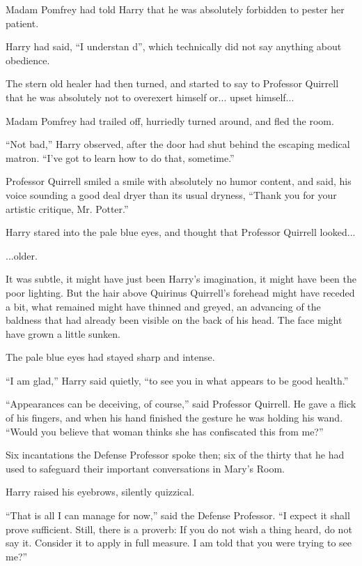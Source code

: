 Madam Pomfrey had told Harry that he was absolutely forbidden to pester her patient.

Harry had said, ``I understan d'', which technically did not say anything about obedience.

The stern old healer had then turned, and started to say to Professor Quirrell that he was absolutely not to overexert himself or... upset himself...

Madam Pomfrey had trailed off, hurriedly turned around, and fled the room.

``Not bad,'' Harry observed, after the door had shut behind the escaping medical matron. ``I've got to learn how to do that, sometime.''

Professor Quirrell smiled a smile with absolutely no humor content, and said, his voice sounding a good deal dryer than its usual dryness, ``Thank you for your artistic critique, Mr. Potter.''

Harry stared into the pale blue eyes, and thought that Professor Quirrell looked...

...older.

It was subtle, it might have just been Harry's imagination, it might have been the poor lighting. But the hair above Quirinus Quirrell's forehead might have receded a bit, what remained might have thinned and greyed, an advancing of the baldness that had already been visible on the back of his head. The face might have grown a little sunken.

The pale blue eyes had stayed sharp and intense.

``I am glad,'' Harry said quietly, ``to see you in what appears to be good health.''

``Appearances can be deceiving, of course,'' said Professor Quirrell. He gave a flick of his fingers, and when his hand finished the gesture he was holding his wand. ``Would you believe that woman thinks she has confiscated this from me?''

Six incantations the Defense Professor spoke then; six of the thirty that he had used to safeguard their important conversations in Mary's Room.

Harry raised his eyebrows, silently quizzical.

``That is all I can manage for now,'' said the Defense Professor. ``I expect it shall prove sufficient. Still, there is a proverb: If you do not wish a thing heard, do not say it. Consider it to apply in full measure. I am told that you were trying to see me?''

